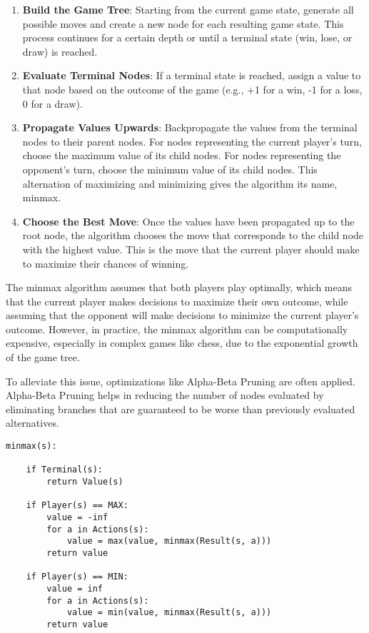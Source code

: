 \documentclass{article}
\begin{document}
\begin{enumerate}
    \item \textbf{Build the Game Tree}: Starting from the current game state, generate all possible moves and create a new node for each resulting game state. This process continues for a certain depth or until a terminal state (win, lose, or draw) is reached.
    \item \textbf{Evaluate Terminal Nodes}: If a terminal state is reached, assign a value to that node based on the outcome of the game (e.g., +1 for a win, -1 for a loss, 0 for a draw).
    \item \textbf{Propagate Values Upwards}: Backpropagate the values from the terminal nodes to their parent nodes. For nodes representing the current player's turn, choose the maximum value of its child nodes. For nodes representing the opponent's turn, choose the minimum value of its child nodes. This alternation of maximizing and minimizing gives the algorithm its name, minmax.
    \item \textbf{Choose the Best Move}: Once the values have been propagated up to the root node, the algorithm chooses the move that corresponds to the child node with the highest value. This is the move that the current player should make to maximize their chances of winning.
\end{enumerate}

The minmax algorithm assumes that both players play optimally, which means that the current player makes decisions to maximize their own outcome, while assuming that the opponent will make decisions to minimize the current player's outcome. However, in practice, the minmax algorithm can be computationally expensive, especially in complex games like chess, due to the exponential growth of the game tree.

To alleviate this issue, optimizations like Alpha-Beta Pruning are often applied. Alpha-Beta Pruning helps in reducing the number of nodes evaluated by eliminating branches that are guaranteed to be worse than previously evaluated alternatives.

\newpage

\begin{lstlisting}
minmax(s):

    if Terminal(s):
        return Value(s)

    if Player(s) == MAX:
        value = -inf
        for a in Actions(s):
            value = max(value, minmax(Result(s, a)))
        return value

    if Player(s) == MIN:
        value = inf
        for a in Actions(s):
            value = min(value, minmax(Result(s, a)))
        return value 
\end{lstlisting}
\end{document}
